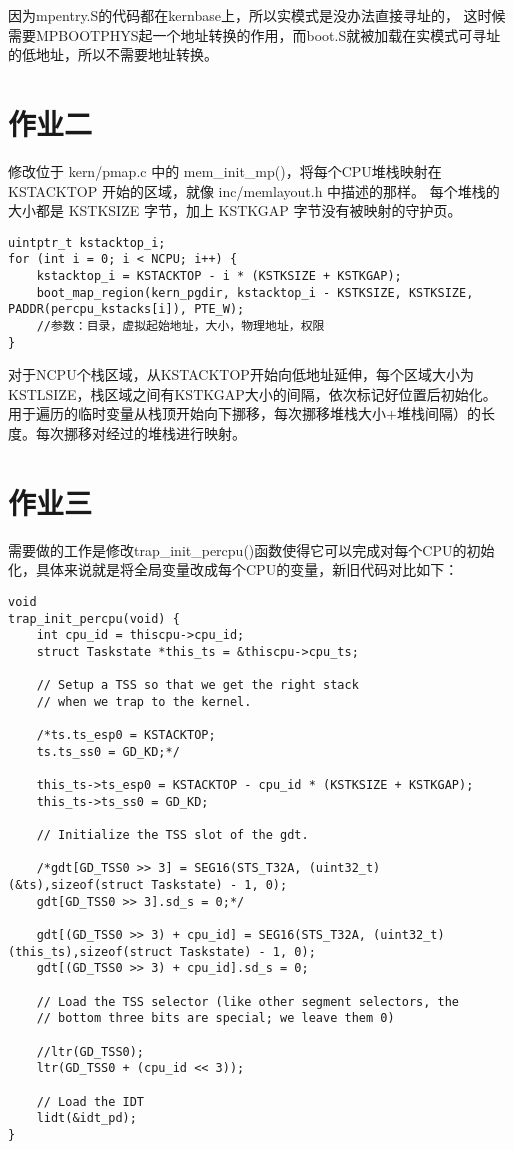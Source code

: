 \documentclass[12pt,a4paper]{article}
\begin{document}
因为mpentry.S的代码都在kernbase上，所以实模式是没办法直接寻址的，
这时候需要MPBOOTPHYS起一个地址转换的作用，而boot.S就被加载在实模式可寻址的低地址，所以不需要地址转换。

\section{作业二}

修改位于 kern/pmap.c 中的 mem\_init\_mp()，将每个CPU堆栈映射在 KSTACKTOP 开始的区域，就像 inc/memlayout.h 中描述的那样。
每个堆栈的大小都是 KSTKSIZE 字节，加上 KSTKGAP 字节没有被映射的守护页。

\begin{lstlisting}[style=CPP]
uintptr_t kstacktop_i;
for (int i = 0; i < NCPU; i++) {
    kstacktop_i = KSTACKTOP - i * (KSTKSIZE + KSTKGAP);
    boot_map_region(kern_pgdir, kstacktop_i - KSTKSIZE, KSTKSIZE, PADDR(percpu_kstacks[i]), PTE_W);
    //参数：目录，虚拟起始地址，大小，物理地址，权限
}
\end{lstlisting}

对于NCPU个栈区域，从KSTACKTOP开始向低地址延伸，每个区域大小为KSTLSIZE，栈区域之间有KSTKGAP大小的间隔，依次标记好位置后初始化。
用于遍历的临时变量从栈顶开始向下挪移，每次挪移堆栈大小+堆栈间隔）的长度。每次挪移对经过的堆栈进行映射。

\section{作业三}

需要做的工作是修改trap\_init\_percpu()函数使得它可以完成对每个CPU的初始化，具体来说就是将全局变量改成每个CPU的变量，新旧代码对比如下：

\begin{lstlisting}[style=CPP]
void
trap_init_percpu(void) {
    int cpu_id = thiscpu->cpu_id;
    struct Taskstate *this_ts = &thiscpu->cpu_ts;        
    
    // Setup a TSS so that we get the right stack
    // when we trap to the kernel.

    /*ts.ts_esp0 = KSTACKTOP;
    ts.ts_ss0 = GD_KD;*/

    this_ts->ts_esp0 = KSTACKTOP - cpu_id * (KSTKSIZE + KSTKGAP);
    this_ts->ts_ss0 = GD_KD;

    // Initialize the TSS slot of the gdt.

    /*gdt[GD_TSS0 >> 3] = SEG16(STS_T32A, (uint32_t) (&ts),sizeof(struct Taskstate) - 1, 0);
    gdt[GD_TSS0 >> 3].sd_s = 0;*/

    gdt[(GD_TSS0 >> 3) + cpu_id] = SEG16(STS_T32A, (uint32_t) (this_ts),sizeof(struct Taskstate) - 1, 0); 
    gdt[(GD_TSS0 >> 3) + cpu_id].sd_s = 0;

    // Load the TSS selector (like other segment selectors, the
    // bottom three bits are special; we leave them 0)

    //ltr(GD_TSS0);
    ltr(GD_TSS0 + (cpu_id << 3));

    // Load the IDT
    lidt(&idt_pd);
}
\end{lstlisting}
\end{document}
